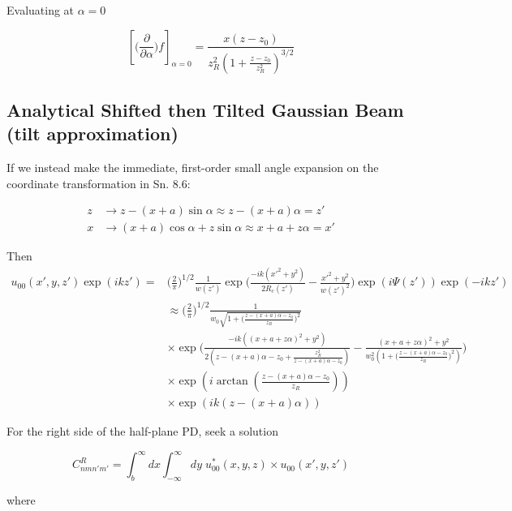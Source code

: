 \documentclass[aps,twoside,secnumarabic,balancelastpage,amsmath,amssymb,nofootinbib,hyperref=pdftex]{revtex4}
\newcommand{\bigfrac}[2]{\Big( \frac{#1}{#2}\Big)}
\begin{document}
Evaluating at $\alpha = 0$

\begin{equation}
    \left[
    \big( \frac{\partial}{\partial \alpha} \big) f
    \right]_{\alpha = 0}
    =
    \frac{x (z - z_0)}{z_R^2 (1+ \frac{z  - z_0}{z_R^2})^{3/2}}
\end{equation}

\clearpage

\subsection{Analytical Shifted then Tilted Gaussian Beam (tilt approximation)}

If we instead make the immediate, first-order small angle expansion on the coordinate transformation in Sn. 8.6:
 
 \begin{align*}
 	z &\rightarrow z-(x+a) \sin \alpha \approx z - (x+a) \alpha = z'
 	\\x &\rightarrow (x+a) \cos \alpha + z \sin \alpha \approx x+a + z \alpha = x'
 \end{align*}

 Then
	\begin{align*} 
		u_{00}(x',y,z') \exp(ikz')=&
			\bigfrac{2}{\pi}^{1/2}
			\frac{1}{w(z')}
			\exp \Big(\frac{-ik(x'^{2}+y^{2})}{2R_{c}(z')}-
			\frac{x'^{2}+y^{2}}{w(z')^{2}} \Big)
			\exp(i \Psi (z'))
			\exp(-ikz')
		\\& \approx
			\bigfrac{2}{\pi}^{1/2}
			\frac{1}{w_0 \sqrt{1+\bigfrac{z-(x+a)\alpha -z_0}{z_R}^2}}
			\\&
			\times
			\exp 
			\Big(
			\frac
			{
			-ik((x+a+z\alpha)^{2}		
			+y^{2})
			}
			{2( z-(x+a)\alpha  - z_0 + 
			\frac{z_R^2}{z-(x+a)\alpha -z_0 } ) }-
			\frac{(x+a+z\alpha)^{2}  +y^{2}}
			{
				w_0^2 (1+\bigfrac{z-(x+a)\alpha-z_0}{z_R}^2)
			}
			\Big)
			\\&
			\times \exp(
			i \arctan( \frac{z-(x+a)\alpha - z_0}{z_R}) )				
			\\&
			\times \exp(
			ik(z - (x+a)\alpha) )						
	\end{align*}

For the right side of the half-plane PD, seek a solution

\begin{equation*}
	C_{nmn'm'}^{R} = 
		\int_{b}^{\infty} dx\int_{-\infty}^{\infty}  dy \;
		u_{00}^* (x,y,z) \times u_{00}(x',y,z')
\end{equation*}

where
\end{document}
